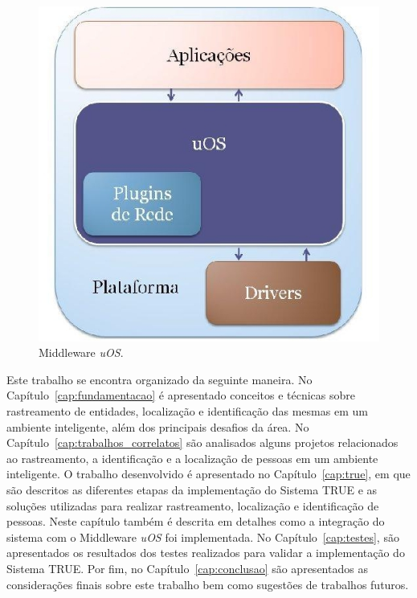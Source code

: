 \begin{figure}[htb]
		\begin{center}
			\includegraphics[scale=0.3]{figuras/1.Introducao/dsoa.jpg}
		\end{center}
		\caption{Middleware \textit{uOS}.}
		\label{fig:uos}
	\end{figure}

Este trabalho se encontra organizado da seguinte maneira. No
Capítulo~\ref{cap:fundamentacao} é apresentado conceitos e técnicas sobre
rastreamento de entidades, localização e identificação das mesmas em um ambiente
inteligente, além dos principais desafios da área. No
Capítulo~\ref{cap:trabalhos_correlatos} são analisados alguns projetos
relacionados ao rastreamento, a identificação e a localização de pessoas em um
ambiente inteligente. O trabalho desenvolvido é apresentado no
Capítulo~\ref{cap:true}, em que são descritos as diferentes etapas da
implementação do Sistema TRUE e as soluções utilizadas para realizar
rastreamento, localização e identificação de pessoas. Neste capítulo também é
descrita em detalhes como a integração do sistema com o Middleware \textit{uOS}
foi implementada. No Capítulo~\ref{cap:testes}, são apresentados os resultados
dos testes realizados para validar a implementação do Sistema TRUE. Por fim, no
Capítulo~\ref{cap:conclusao} são apresentados as considerações finais sobre este
trabalho bem como sugestões de trabalhos futuros.


